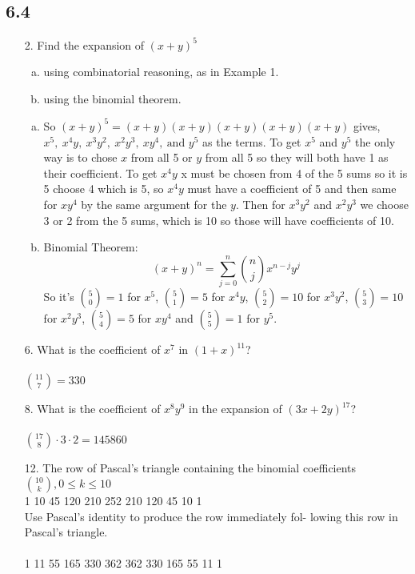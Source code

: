 \subsection{6.4}
\begin{itemize}
    \item[2.]  Find the expansion of $(x + y)^5$
          \begin{enumerate}[a.]
              \item using combinatorial reasoning, as in Example 1.
              \item using the binomial theorem.
          \end{enumerate}
          \answer
          \begin{enumerate}[a.]
              \item So $(x+y)^5 = (x+y)(x+y)(x+y)(x+y)(x+y)$ gives, $x^5,\ x^4y,\ x^3y^2,\ x^2y^3,\ xy^4,\ \text{and } y^5$ as the terms. 
              To get $x^5$ and $y^5$ the only way is to chose $x$ from all 5 or $y$ 
              from all 5 so they will both have 1 as their coefficient. To get $x^4y$ 
              x must be chosen from 4 of the 5 sums so it is 5 choose 4 which is 5, 
              so $x^4y$ must have a coefficient of 5 and then same for $xy^4$ by the same
              argument for the $y$. Then for $x^3y^2$ and $x^2y^3$ we choose 3 or 2 from
              the 5 sums, which is 10 so those will have coefficients of 10.
              \item Binomial Theorem:
              \begin{equation*}
                  (x+y)^n = \sum_{j=0}^{n} {n \choose j}x^{n-j}y^j 
              \end{equation*}
              So it's ${5 \choose 0} = 1$ for $x^5$, ${5 \choose 1} = 5$ for $x^4y$, ${5 \choose 2} = 10$ for $x^3y^2$, ${5 \choose 3} = 10$ for $x^2y^3$, 
              ${5 \choose 4} = 5$ for $xy^4$ and ${5 \choose 5} =1$ for $y^5$.
          \end{enumerate}
\item[6.]  What is the coefficient of $x^7$ in $(1 + x)^{11}$? \\
\answer \\
${11 \choose 7} = 330$

\item[8.] What is the coefficient of $x^8y^9$ in the expansion of
$(3x + 2y)^{17}$? \\
\answer \\
${17 \choose 8} \cdot 3 \cdot 2 = 145860$

\item[12.]  The row of Pascal’s triangle containing the binomial coefficients ${10 \choose k}, 0 \leq k \leq 10$ \\
1 10 45 120 210 252 210 120 45 10 1 \\
Use Pascal’s identity to produce the row immediately fol-
lowing this row in Pascal’s triangle. \\
\answer \\
1 11 55 165 330 362 362 330 165 55 11 1

\end{itemize}